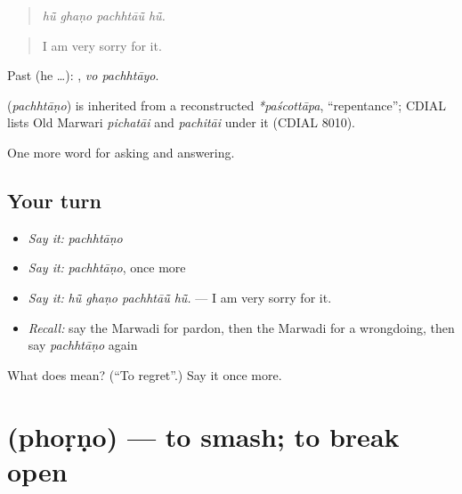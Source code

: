 \begin{quote}
   
\end{quote}

\begin{quote}
\emph{hū̃ ghaṇo pachhtāū̃ hū̃.}
\end{quote}

\begin{quote}
I am very sorry for it.
\end{quote}

Past (he …):  , \emph{vo pachhtāyo}.

\begin{cousinweb}
\textbf{} (\emph{pachhtāṇo}) is inherited from a reconstructed \emph{*paścottāpa}, \textquotedblleft{}repentance\textquotedblright{}; CDIAL lists Old Marwari \emph{pichatāi} and \emph{pachitāi} under it (CDIAL 8010).
\end{cousinweb}

\begin{grammarlens}[title={What you've built}]
One more word for asking and answering.
\end{grammarlens}

\subsection*{Your turn}
\begin{itemize}
\raggedright
  \item \emph{Say it:} \emph{pachhtāṇo}
  \item \emph{Say it:} \emph{pachhtāṇo}, once more
  \item \emph{Say it:} \emph{hū̃ ghaṇo pachhtāū̃ hū̃.} — I am very sorry for it.
  \item \emph{Recall:} say the Marwadi for pardon, then the Marwadi for a wrongdoing, then say \emph{pachhtāṇo} again
\end{itemize}

\begin{tcolorbox}[breakable,colback=teal!4,colframe=teal!35!black,title={Before you move on}]
What does  mean? (\textquotedblleft{}To regret\textquotedblright{}.) Say it once more.
\end{tcolorbox}
\section[\texorpdfstring{\mw{फोड़णो} (phoṛṇo)}{फोड़णो (phoṛṇo)}]{ (phoṛṇo) — to smash; to break open}

